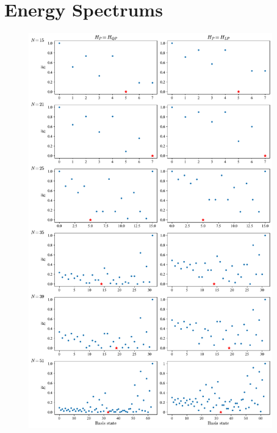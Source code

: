 \newpage
\section{Energy Spectrums}
\label{Section:EnergySpectrums}

\begin{figure}[H]
    \centering
    \includegraphics[width=0.94\textwidth]{06-appendix/figs/energy_spectrums_all1.pdf}
\end{figure}

